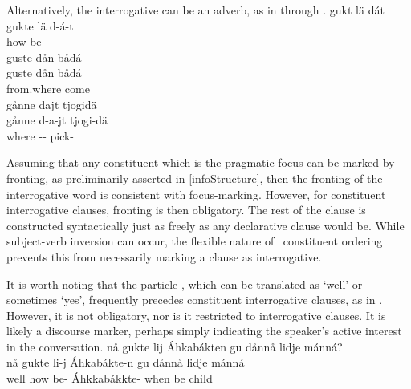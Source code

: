 Alternatively, the interrogative can be an adverb, as in  through . %
\ea\label{questionWordQ6}%
\glll	gukt lä dát\\
	gukte lä d-á-t\\
	how be\BS{} --\\\nopagebreak
{} 
\z
\ea\label{questionWordQ7}%
\glll	guste dån bådá\\
	guste dån bådá\\
	from.where  come\BS{}\\\nopagebreak
{} 
\z
\ea\label{questionWordQ8}%
\glll	gånne dajt tjogidä\\
	gånne d-a-jt tjogi-dä\\
	where -- pick-\\\nopagebreak
{} 
\z

Assuming that any constituent which is the pragmatic focus can be marked by fronting, as preliminarily asserted in \SEC\ref{infoStructure}, then the fronting of the interrogative word is consistent with focus-marking. However, for constituent interrogative clauses, fronting is then obligatory. 
The rest of the clause is constructed syntactically just as freely as any declarative clause would be. While subject-verb inversion can occur, the flexible nature of \PS\ constituent ordering prevents this from necessarily marking a clause as interrogative. 

It is worth noting that the particle , which can be translated as ‘well’ or sometimes ‘yes’, frequently precedes constituent interrogative clauses, as in . However, it is not obligatory, nor is it restricted to interrogative clauses. It is likely a discourse marker, perhaps simply indicating the speaker’s active interest in the conversation.
\ea\label{nåQ1}%
\glll	nå gukte lij Áhkabákten gu dånnå lidje mánná?\\
	nå gukte li-j Áhkabákte-n gu dånnå lidje mánná\\
	well how be- Áhkkabákkte- when  be\BS{} child\BS{}\\\nopagebreak
{} 
\z


